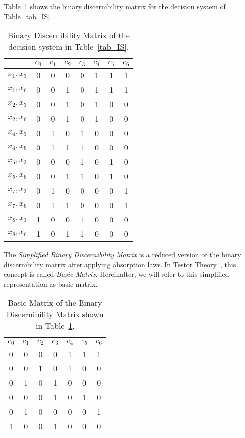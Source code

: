 \documentclass[authoryear,preprint,review,12pt]{elsarticle}
\begin{document}
  Table~\ref{tab_BDM} shows the binary discernibility matrix for the decision system of Table~\ref{tab_IS}.  
  
  \begin{table}[htb]
		\caption{Binary Discernibility Matrix of the decision system in Table~\ref{tab_IS}.} \label{tab_BDM}
		\centering
 	\begin{tabular}{c|ccccccc}
 		& $c_0$ & $c_1$ & $c_2$ & $c_3$ & $c_4$ & $c_5$ & $c_6$\\
 		\hline
		$x_1,x_3$ & 0&0&0&0&1&1&1\\
		$x_1,x_6$ & 0&0&1&0&1&1&1\\
		$x_2,x_3$ & 0&0&1&0&1&0&0\\
		$x_2,x_6$ & 0&0&1&0&1&0&0\\
		$x_4,x_3$ & 0&1&0&1&0&0&0\\
		$x_4,x_6$ & 0&1&1&1&0&0&0\\
		$x_5,x_3$ & 0&0&0&1&0&1&0\\
		$x_5,x_6$ & 0&0&1&1&0&1&0\\
		$x_7,x_3$ & 0&1&0&0&0&0&1\\
		$x_7,x_6$ & 0&1&1&0&0&0&1\\
		$x_8,x_3$ & 1&0&0&1&0&0&0\\
		$x_8,x_6$ & 1&0&1&1&0&0&0\\
 	\end{tabular}             
  \end{table}

  The \textit{Simplified Binary Discernibility Matrix} is a reduced version of the binary discernibility matrix after applying absorption laws. In Testor Theory~\citep{Lazo01}, this concept is called \textit{Basic Matrix}. Hereinafter, we will refer to this simplified representation as basic matrix.
    
  \begin{table}[htb]
	\caption{Basic Matrix of the Binary Discernibility Matrix shown in Table~\ref{tab_BDM}.}
	\centering
   	\begin{tabular}{ccccccc}\label{tab:SBDM1}
              $c_0$ & $c_1$ & $c_2$ & $c_3$ & $c_4$ & $c_5$ & $c_6$\\
          		\hline
          		0&0&0&0&1&1&1\\
          		0&0&1&0&1&0&0\\
          		0&1&0&1&0&0&0\\
          		0&0&0&1&0&1&0\\
          		0&1&0&0&0&0&1\\
          		1&0&0&1&0&0&0\\
   	\end{tabular}             
  \end{table}  
   
\end{document}
